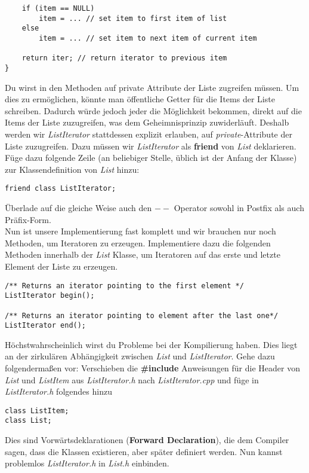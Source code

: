\begin{enumerate}
\begin{lstlisting}
	if (item == NULL)
		item = ... // set item to first item of list
	else
		item = ... // set item to next item of current item
	
	return iter; // return iterator to previous item
}
\end{lstlisting} 

Du wirst in den Methoden auf private Attribute der Liste zugreifen müssen. Um dies zu ermöglichen, könnte man öffentliche Getter für die Items der Liste schreiben.
Dadurch würde jedoch jeder die Möglichkeit bekommen, direkt auf die Items der Liste zuzugreifen, was dem Geheimnisprinzip zuwiderläuft.
Deshalb werden wir \emph{ListIterator} stattdessen explizit erlauben, auf \emph{private}-Attribute der Liste zuzugreifen.
Dazu müssen wir \emph{ListIterator} als \textbf{friend} von \emph{List} deklarieren.
Füge dazu folgende Zeile (an beliebiger Stelle, üblich ist der Anfang der Klasse) zur Klassendefinition von \emph{List} hinzu:
\begin{lstlisting}
friend class ListIterator;
\end{lstlisting}

Überlade auf die gleiche Weise auch den \textbf{$--$} Operator sowohl in Postfix als auch Präfix-Form. \\

Nun ist unsere Implementierung fast komplett und wir brauchen nur noch Methoden, um Iteratoren zu erzeugen.
Implementiere dazu die folgenden Methoden innerhalb der \emph{List} Klasse, um Iteratoren auf das erste und letzte Element der Liste zu erzeugen. 
\begin{lstlisting}
/** Returns an iterator pointing to the first element */
ListIterator begin();

/** Returns an iterator pointing to element after the last one*/
ListIterator end();
\end{lstlisting} 

Höchstwahrscheinlich wirst du Probleme bei der Kompilierung haben.
Dies liegt an der zirkulären Abhängigkeit zwischen \emph{List} und \emph{ListIterator}.
Gehe dazu folgendermaßen vor: 
Verschieben die \textbf{\#include} Anweisungen für die Header von \emph{List} und \emph{ListItem} aus \emph{ListIterator.h} nach \emph{ListIterator.cpp} und füge in \emph{ListIterator.h} folgendes hinzu

\begin{lstlisting}
class ListItem;
class List;
\end{lstlisting}

Dies sind Vorwärtsdeklarationen (\textbf{Forward Declaration}), die dem Compiler sagen, dass die Klassen existieren, aber später definiert werden. Nun kannst problemlos \emph{ListIterator.h} in \emph{List.h} einbinden. 


\end{enumerate}
